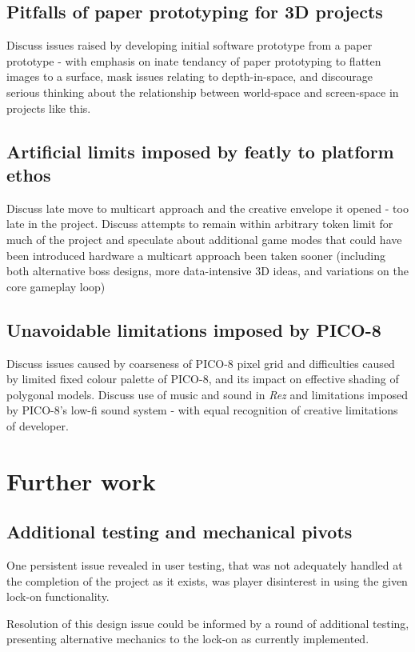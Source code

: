 \documentclass[11pt]{article}
\begin{document}
\subsection{Pitfalls of paper prototyping for 3D projects}\label{prototypepitfalls}
Discuss issues raised by developing initial software prototype from a paper prototype
- with emphasis on inate tendancy of paper prototyping to flatten images to a surface,
mask issues relating to depth-in-space, and discourage serious thinking about the
relationship between world-space and screen-space in projects like this.
\subsection{Artificial limits imposed by featly to platform ethos}
Discuss late move to multicart approach and the creative envelope it opened - too late
in the project. Discuss attempts to remain within arbitrary token limit for much of the
project and speculate about additional game modes that could have been introduced hardware
a multicart approach been taken sooner (including both alternative boss designs, more
data-intensive 3D ideas, and variations on the core gameplay loop)
\subsection{Unavoidable limitations imposed by PICO-8}
Discuss issues caused by coarseness of PICO-8 pixel grid and difficulties caused by
limited fixed colour palette of PICO-8, and its impact on effective shading of polygonal
models. Discuss use of music and sound in \textit{Rez} and limitations imposed by PICO-8's
low-fi sound system - with equal recognition of creative limitations of developer.


\section{Further work}

\subsection{Additional testing and mechanical pivots}
One persistent issue revealed in user testing, that was not adequately handled at the completion of
the project as it exists, was player disinterest in using the given lock-on functionality.

Resolution of this design issue could be informed by a round of additional testing, presenting
alternative mechanics to the lock-on as currently implemented.
\end{document}

